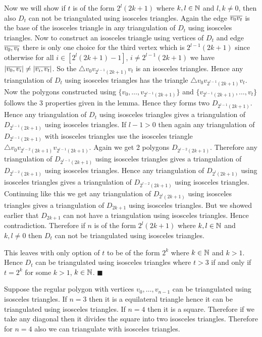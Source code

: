 \documentclass[a4paper, 11pt]{article}
\renewenvironment{proof}{\noindent{\it \textbf{Proof:}}\hspace*{1em}}{\hfill $\blacksquare$\bigskip\\}
\begin{document}
{\begin{itemize}[label=$\bullet$]
\begin{itemize}
\begin{proof}
	Now we will show if $t$ is of the form $2^l(2k+1)$ where $k,l\in\mathbb{N}$ and $l,k\neq 0$, then also $D_t$ can not be triangulated using isosceles triangles. Again the edge $\overline{v_0v_t}$ is the base of the isosceles triangle in any triangulation of $D_t$ using isosceles triangles. Now to construct an isosceles triangle using vertices of $D_t$ and edge $\overline{v_0,v_t}$ there is only one choice for the third vertex which is $2^{l-1}(2k+1)$ since otherwise for all $i\in [2^l(2k+1)-1]$, $i\neq 2^{l-1}(2k+1)$ we have $|\overline{v_0,v_i}|\neq |\overline{v_i,v_t}|$. So the $\triangle v_0v_{2^{l-1}(2k+1)}v_t$ is an isosceles triangles. Hence any triangulation of $D_t$ using isosceles triangles has the triangle $\triangle v_0v_{2^{l-1}(2k+1)}v_t$. Now the polygons constructed using $\{v_0,\dots, v_{2^{l-1}(2k+1)}\}$ and $\{v_{2^{l-1}(2k+1)},\dots, v_t\}$ follows the 3 properties given in the lemma. Hence they forms two $D_{{2^{l-1}(2k+1)}}$. Hence any triangulation of $D_t$ using isosceles triangles gives a triangulation of $D_{2^{l-1}(2k+1)}$ using isosceles triangles. If $l-1>0$ then again any triangulation of $D_{2^{l-1}(2k+1)}$ with isosceles triangles use the isosceles triangle $\triangle v_0 v_{2^{l-2}(2k+1)}v_{2^{l-1}(2k+1)}$. Again we get 2 polygons $D_{2^{l-2}(2k+1)}$. Therefore any triangulation  of $D_{2^{l-1}(2k+1)}$ using isosceles triangles gives a triangulation of $D_{2^{l-2}(2k+1)}$ using isosceles triangles. Hence any triangulation of $D_{2^l(2k+1)}$ using isosceles triangles gives a triangulation of $D_{2^{l-2}(2k+1)}$ using isosceles triangles. Continuing like this we get any triangulation of $D_{2^l(2k+1)}$ using isosceles triangles gives a triangulation of $D_{2k+1}$ using isosceles triangles. But we showed earlier that $D_{2k+1}$ can not have   a triangulation using isosceles triangles. Hence contradiction. Therefore if $n$ is of the form $2^l(2k+1)$ where $k,l\in\mathbb{N}$ and $k,l\neq 0$ then $D_t$ can not be triangulated using isosceles triangles.
	
	This leaves with only option of $t$ to be of the form $2^k$ where $k\in \mathbb{N}$ and $k>1$. Hence $D_t$ can be triangulated using isosceles triangles where $t>3$ if and only if $t=2^k$ for some $k>1$, $k\in\mathbb{N}$.
\end{proof}

Suppose the regular polygon with vertices $v_0,\dots, v_{n-1}$ can be triangulated using isosceles triangles. If $n=3$ then it is a equilateral triangle hence it can be triangulated using isosceles triangles. If $n=4$ then it is a square. Therefore if we take any diagonal then it divides the square into two isosceles triangles. Therefore for $n=4$ also we can triangulate with isosceles triangles.


\end{itemize}
\end{itemize}}
\end{document}
